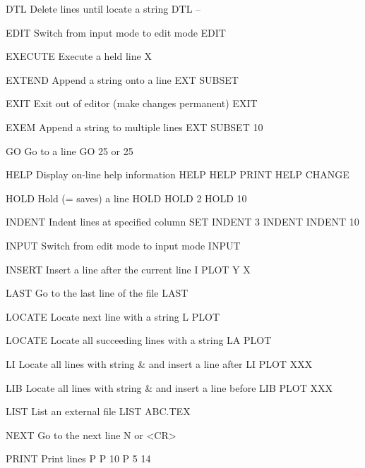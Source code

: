 DTL       Delete lines until locate a string          DTL --
 
EDIT      Switch from input mode to edit mode         EDIT
 
EXECUTE   Execute a held line                         X
 
EXTEND    Append a string onto a line                 EXT  SUBSET
 
EXIT      Exit out of editor (make changes permanent) EXIT
 
EXEM      Append a string to multiple lines           EXT  SUBSET 10
 
GO        Go to a line                                GO 25
                                                      or 25
 
HELP      Display on-line help information            HELP
                                                      HELP PRINT
                                                      HELP CHANGE
 
HOLD      Hold (= saves) a line                       HOLD
                                                      HOLD 2
                                                      HOLD 10
 
INDENT    Indent lines at specified column            SET INDENT 3
                                                      INDENT
                                                      INDENT 10
 
INPUT     Switch from edit mode to input mode         INPUT
 
INSERT    Insert a line after the current line        I PLOT Y X
 
LAST      Go to the last line of the file             LAST
 
LOCATE    Locate next line with a string              L PLOT
 
LOCATE    Locate all succeeding lines with a string   LA PLOT
 
LI        Locate all lines with string & and
          insert a line after                         LI PLOT XXX
 
LIB       Locate all lines with string & and
          insert a line before                        LIB PLOT XXX
 
 
LIST      List an external file                       LIST ABC.TEX
 
NEXT      Go to the next line                         N
                                                      or <CR>
 
PRINT     Print lines                                 P
                                                      P 10
                                                      P 5 14
 
